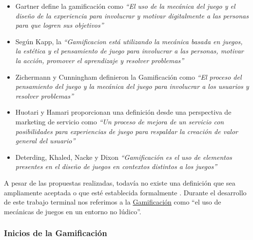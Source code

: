     \begin{itemize}

        \item Gartner define la gamificación como \textit{``El uso de la mecánica del juego y 
        el diseño de la experiencia para involucrar y motivar digitalmente a las personas para 
        que logren sus objetivos''} \cite{definicion3} %
        
        \item Según Kapp, la \textit{``Gamificacion está utilizando la mecánica basada en juegos, 
        la estética y el pensamiento de juego para involucrar a las personas, motivar la acción, 
        promover el aprendizaje y resolver problemas''} \cite{definicion4} %
        
        \item Zichermann y Cunningham definieron la Gamificación como \textit{``El proceso del 
        pensamiento del juego y la mecánica del juego para involucrar a los usuarios y resolver 
        problemas''} \cite{GamByDesign} %
        
        \item Huotari y Hamari proporcionan una definición desde una perspectiva de marketing
         de servicio como \textit{``Un proceso de mejora de un servicio con posibilidades para 
         experiencias de juego para respaldar la creación de valor general del usuario''} \cite{definicion6}  %
        
        \item Deterding, Khaled, Nacke y Dixon \textit{``Gamificación es el uso de elementos 
        presentes en el diseño de juegos en contextos distintos a los juegos''} \cite{definicion7} %
    
    \end{itemize}

\noindent A pesar de las propuestas realizadas, todavía no existe una definición que sea ampliamente aceptada o que esté establecida formalmente \cite{definicion2}. Durante el desarrollo de este trabajo terminal nos referimos a la \hyperlink{tGamificacion}{Gamificación} como ``el uso de mecánicas de juegos en un entorno no lúdico''.


\subsubsection{Inicios de la Gamificación}

